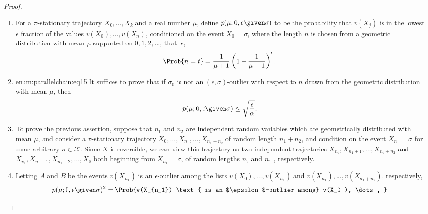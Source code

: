 \documentclass[12pt]{article}
\begin{document}
\begin{proof}
    \begin{enumerate}
        \item
            For a \( \pi \)-stationary trajectory \( X_0, \dots, X_k \)
            and a real number \( \mu \), define \( p(\mu; 0, \epsilon
            \given \sigma) \) to be the probability that \( v(X_j) \) is
            in the lowest \( \epsilon \) fraction of the values \( v(X_0),
            \dots, v(X_n) \), conditioned on the event \( X_0 = \sigma \),
            where the length \( n \) is chosen from a geometric
            distribution with mean \( \mu \) supported on \( 0,1,2,\dots
            \); that is,
            \[
                \Prob{n = t} = \frac{1}{\mu+1}\left( 1 - \frac{1}{\mu+1}
                \right)^t.
            \]
        \item
            {enum:parallelchain:eq15} It suffices to prove that if \(
            \sigma_0 \) is not an \( (\epsilon, \sigma) \)-outlier with
            respect to \( n \) drawn from the geometric distribution
            with mean \( \mu \), then
            \[
                p(\mu; 0, \epsilon \given \sigma) \le \sqrt{\frac{\epsilon}
                {\alpha}}.
            \]
        \item
            To prove the previous assertion, suppose that \( n_1 \) and \(
            n_2 \) are independent random variables which are
            geometrically distributed with mean \( \mu \), and consider
            a \( \pi \)-stationary trajectory \( X_0, \dots, X_{n_1},
            \dots, X_{n_1 +n_2} \) of random length \( n_1 + n_2 \), and
            condition on the event \( X_{n_1} = \sigma \) for some
            arbitrary \( \sigma \in \mathcal{X} \).  Since \( X \) is
            reversible, we can view this trajectory as two independent
            trajectories \( X_{n_1}, X_{n_1 +1}, \dots, X_{n_1 +n_2} \)
            and \( X_{n_1}, X_{n_1 - 1}, X_{n_1 - 2}, \dots, X_0 \) both
            beginning from \( X_{n_1} = \sigma \), of random lengths \(
            n_2 \) and \( n_1 \) , respectively.
        \item
            \label{enum:parallelchain:eq16} Letting \( A \) and \( B \)
            be the events \( v(X_{n_1}) \) is an \( \epsilon \)-outlier
            among the lists \( v(X_0 ), \dots, v(X_{n_1}) \) and \( v(X_
            {n_1}), \dots, v(X_{n_1 +n_2}) \), respectively,
            \[
                p(\mu; 0, \epsilon \given \sigma)^2 = \Prob{v(X_{n_1})
                \text{ is an $\epsilon$-outlier among} v(X_0 ), \dots,
}\]
\end{enumerate}
\end{proof}
\end{document}

